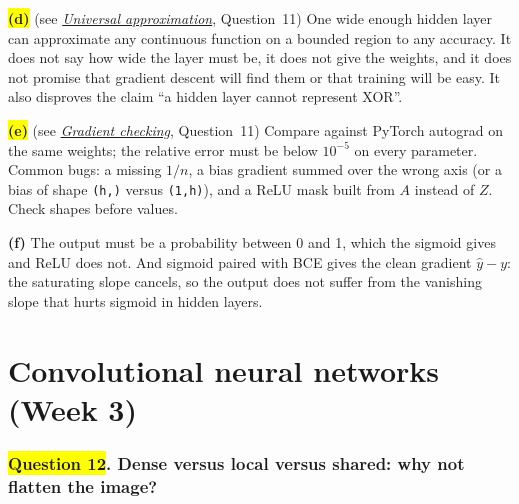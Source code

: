 \documentclass[12pt,a4paper]{article}
\newcommand{\seeconcept}[3]{(see \hyperref[#1]{\textit{#2}}, Question~#3)}
\newcommand{\hlq}[1]{{\setlength{\fboxsep}{1.5pt}\colorbox{yellow}{#1}}}
\begin{document}
\hlq{\textbf{(d)}} \seeconcept{c:uat}{Universal approximation}{11} One wide enough hidden layer can approximate any continuous function on a bounded region to any accuracy. It does not say how wide the layer must be, it does not give the weights, and it does not promise that gradient descent will find them or that training will be easy. It also disproves the claim ``a hidden layer cannot represent XOR''.

\hlq{\textbf{(e)}} \seeconcept{c:gradcheck}{Gradient checking}{11} Compare against PyTorch autograd on the same weights; the relative error must be below $10^{-5}$ on every parameter. Common bugs: a missing $1/n$, a bias gradient summed over the wrong axis (or a bias of shape \texttt{(h,)} versus \texttt{(1,h)}), and a ReLU mask built from $A$ instead of $Z$. Check shapes before values.

\textbf{(f)} The output must be a probability between 0 and 1, which the sigmoid gives and ReLU does not. And sigmoid paired with BCE gives the clean gradient $\hat y-y$: the saturating slope cancels, so the output does not suffer from the vanishing slope that hurts sigmoid in hidden layers.
\part{Convolutional neural networks (Week 3)}

\section[Question 12. Dense versus local versus shared: why not flatten the image?]{\hlq{Question 12}. Dense versus local versus shared: why not flatten the image?}
\end{document}
